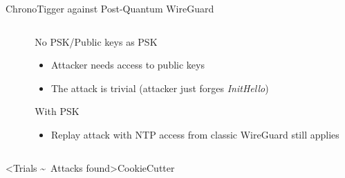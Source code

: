 \begin{frame}{ChronoTigger against Post-Quantum WireGuard}
  \begin{columns}[fullwidth,T]
    \begin{column}{.5\linewidth}
    \end{column}

    \begin{column}{.4\linewidth}
      \begin{block}{No PSK/Public keys as PSK}
      \begin{itemize}
        \item Attacker needs access to public keys
        \item The attack is trivial (attacker just forges \emph{InitHello})
      \end{itemize}
      \end{block}

      \begin{block}{With PSK}
      \begin{itemize}
        \item Replay attack with NTP access from classic WireGuard still applies
      \end{itemize}
      \end{block}
    \end{column}
  \end{columns}
\end{frame}

\interlude[3]<Trials \textasciitilde\ Attacks found>{CookieCutter}

